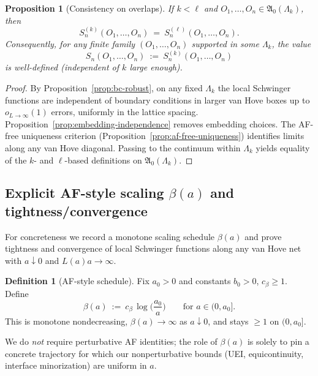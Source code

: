 \documentclass[11pt]{amsart}
\theoremstyle{plain}
\newtheorem{proposition}[theorem]{Proposition}
\theoremstyle{definition}
\newtheorem{definition}[theorem]{Definition}
\theoremstyle{remark}
\begin{document}
\begin{proposition}[Consistency on overlaps]\label{prop:consistency-overlaps}
If $k<\ell$ and $O_1,\dots,O_n\in\mathfrak A_0(\Lambda_k)$, then
\[
  S^{(k)}_n(O_1,\dots,O_n)\ =\ S^{(\ell)}_n(O_1,\dots,O_n).
\]
Consequently, for any finite family $(O_1,\dots,O_n)$ supported in some $\Lambda_k$, the value
\[
  S_n(O_1,\dots,O_n)\ :=\ S^{(k)}_n(O_1,\dots,O_n)
\]
is well-defined (independent of $k$ large enough).
\end{proposition}
\begin{proof}
By Proposition~\ref{prop:bc-robust}, on any fixed $\Lambda_k$ the local Schwinger functions are independent of boundary conditions in larger van Hove boxes up to $o_{L\to\infty}(1)$ errors, uniformly in the lattice spacing. Proposition~\ref{prop:embedding-independence} removes embedding choices. The AF-free uniqueness criterion (Proposition~\ref{prop:af-free-uniqueness}) identifies limits along any van Hove diagonal. Passing to the continuum within $\Lambda_k$ yields equality of the $k$- and $\ell$-based definitions on $\mathfrak A_0(\Lambda_k)$.
\end{proof}

\subsection{Explicit AF-style scaling $\beta(a)$ and tightness/convergence}\label{subsec:beta-schedule}

For concreteness we record a monotone scaling schedule $\beta(a)$ and prove tightness and convergence of local Schwinger functions along any van Hove net with $a\downarrow 0$ and $L(a) a\to\infty$.

\begin{definition}[AF-style schedule]\label{def:beta-schedule}
Fix $a_0>0$ and constants $b_0>0$, $c_\beta\ge 1$. Define
\[
  \beta(a)\ :=\ c_\beta\,\log\Big(\frac{a_0}{a}\Big)\qquad \text{for } a\in(0,a_0].
\]
This is monotone nondecreasing, $\beta(a)\to\infty$ as $a\downarrow 0$, and stays $\ge 1$ on $(0,a_0]$.
\end{definition}

We do \emph{not} require perturbative AF identities; the role of $\beta(a)$ is solely to pin a concrete trajectory for which our nonperturbative bounds (UEI, equicontinuity, interface minorization) are uniform in $a$.
\end{document}
